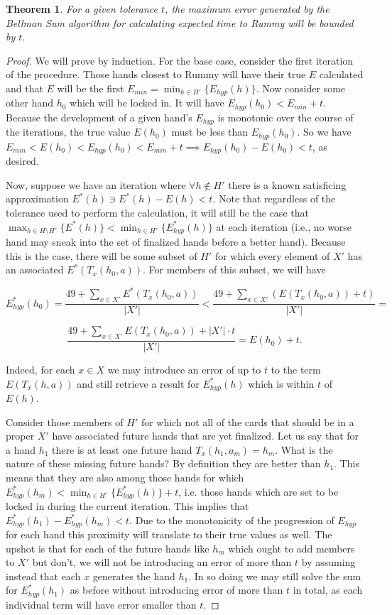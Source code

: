 \documentclass[letter,12pt]{article}
\newtheorem{theorem}{Theorem}
\begin{document}
\begin{theorem}
For a given tolerance $t$, the maximum error generated by the Bellman Sum algorithm for calculating expected time to Rummy will be bounded by $t$.
\end{theorem}

\begin{proof}
We will prove by induction. For the base case, consider the first iteration of the procedure. Those hands closest to Rummy will have their true $E$ calculated and that $E$ will be the first $E_{min} = \min_{h \in H'} \{E_{hyp}(h)\}$. Now consider some other hand $h_0$ which will be locked in. It will have $E_{hyp}(h_0) < E_{min} + t$. Because the development of a given hand's $E_{hyp}$ is monotonic over the course of the iterations, the true value $E(h_0)$ must be less than $E_{hyp}(h_0)$. So we have $E_{min} < E(h_0) < E_{hyp}(h_0) < E_{min} + t \implies E_{hyp}(h_0) - E(h_0) < t$, as desired.

Now, suppose we have an iteration where $\forall h \notin H'$ there is a known satisficing approximation $E^*(h) \ni E^*(h) - E(h) < t$. Note that regardless of the tolerance used to perform the calculation, it will still be the case that $\max_{h \in H\setminus H'}\{E^*(h)\} < \min_{h \in H'}\{E_{hyp}^*(h)\}$ at each iteration (i.e., no worse hand may sneak into the set of finalized hands before a better hand). Because this is the case, there will be some subset of $H'$ for which every element of $X'$ has an associated $E^*(T_x(h_0,a))$. For members of this subset, we will have

$$E_{hyp}^*(h_0) = \frac{49+\sum_{x\in X'} E^*(T_x(h_0,a))}{|X'|} <  \frac{49+\sum_{x\in X'} (E(T_x(h_0,a))+t)}{|X'|} = $$

$$\frac{49+\sum_{x\in X'} E(T_x(h_0,a))+|X'| \cdot t}{|X'|} = E(h_0) + t.$$

Indeed, for each $x \in X$ we may introduce an error of up to $t$ to the term $E(T_x(h,a))$ and still retrieve a result for $E_{hyp}^*(h)$ which is within $t$ of $E(h)$.

Consider those members of $H'$ for which not all of the cards that should be in a proper $X'$ have associated future hands that are yet finalized. Let us say that for a hand $h_1$ there is at least one future hand $T_x(h_1,a_m) = h_m$. What is the nature of these missing future hands? By definition they are better than $h_1$. This means that they are also among those hands for which $E_{hyp}^*(h_m) < \min_{h \in H'}\{E_{hyp}^*(h)\}+t$, i.e. those hands which are set to be locked in during the current iteration. This implies that $E_{hyp}^*(h_1)-E_{hyp}^*(h_m) < t$. Due to the monotonicity of the progression of $E_{hyp}$ for each hand this proximity will translate to their true values as well. The upshot is that for each of the future hands like $h_m$ which ought to add members to $X'$ but don't, we will not be introducing an error of more than $t$ by assuming instead that each $x$ generates the hand $h_1$. In so doing we may still solve the sum for $E_{hyp}^*(h_1)$ as before without introducing error of more than $t$ in total, as each individual term will have error smaller than $t$.


\end{proof}
\end{document}

